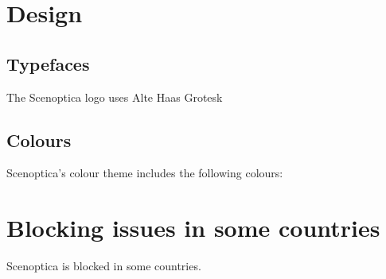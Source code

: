 \documentclass[11pt, a4paper]{article}
\begin{document}
\section*{Design}

\subsection*{Typefaces}

The Scenoptica logo uses Alte Haas Grotesk

\subsection*{Colours}

Scenoptica's colour theme includes the following colours:

\section*{Blocking issues in some countries}

Scenoptica is blocked in some countries.
\end{document}
